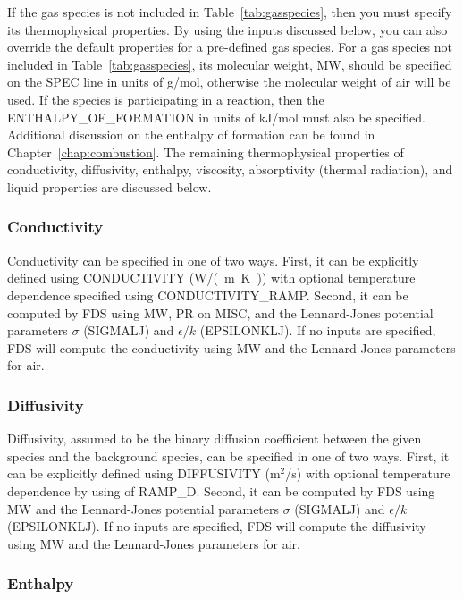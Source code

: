 \documentclass[11pt]{book}
\begin{document}
If the gas species is not included in Table~\ref{tab:gasspecies}, then you must specify its thermophysical properties.  By using the inputs discussed below, you can also override the default properties for a pre-defined gas species.  For a gas species not included in Table~\ref{tab:gasspecies}, its molecular weight, {\ct MW}, should be specified on the {\ct SPEC} line in units of g/mol, otherwise the molecular weight of air will be used.  If the species is participating in a reaction, then the {\ct ENTHALPY\_OF\_FORMATION} in units of kJ/mol must also be specified. Additional discussion on the enthalpy of formation can be found in Chapter~\ref{chap:combustion}.  The remaining thermophysical properties of conductivity, diffusivity, enthalpy, viscosity, absorptivity (thermal radiation), and liquid properties are discussed below.

\subsubsection{Conductivity}

Conductivity can be specified in one of two ways.  First, it can be explicitly defined using {\ct CONDUCTIVITY} (\si{W/(m.K)}) with optional temperature dependence specified using {\ct CONDUCTIVITY\_RAMP}.  Second, it can be computed by FDS using {\ct MW}, {\ct PR} on {\ct MISC}, and the Lennard-Jones potential parameters $\sigma$ ({\ct SIGMALJ}) and $\epsilon/k$ ({\ct EPSILONKLJ}).  If no inputs are specified, FDS will compute the conductivity using {\ct MW} and the Lennard-Jones parameters for air.

\subsubsection{Diffusivity}

Diffusivity, assumed to be the binary diffusion coefficient between the given species and the background species, can be specified in one of two ways.  First, it can be explicitly defined using {\ct DIFFUSIVITY} (m$^2$/s) with optional temperature dependence by using of {\ct RAMP\_D}.  Second, it can be computed by FDS using {\ct MW} and the Lennard-Jones potential parameters $\sigma$ ({\ct SIGMALJ}) and $\epsilon/k$ ({\ct EPSILONKLJ}).  If no inputs are specified, FDS will compute the diffusivity using {\ct MW} and the Lennard-Jones parameters for air.

\subsubsection{Enthalpy}
\label{info:Enthalpy}
\end{document}
